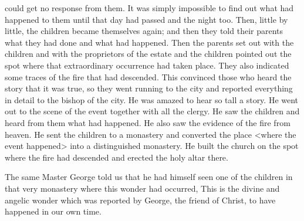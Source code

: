 could get no response from them.
It was simply impossible to find
out what had happened to them until that day had passed and the
night too.
Then, little by little, the children became themselves
again; and then they told their parents what they had done and
what had happened.
Then the parents set out with the children and
with the proprietors of the estate and the children pointed out the
spot where that extraordinary occurrence had taken place.
They also
indicated some traces of the fire that had descended.
This convinced
those who heard the story that it was true, so they went running to
the city and reported everything in detail to the bishop of the city.
He was amazed to hear so tall a story.
He went out to the scene of
the event together with all the clergy.
He saw the children and heard
from them what had happened.
He also saw the evidence of the fire
from heaven.
He sent the children to a monastery and converted the
place <where the event happened> into a distinguished monastery.
He built the church on the spot where the fire had descended and
erected the holy altar there.

The same Master George told us that he had himself seen one
of the children in that very monastery where this wonder had
occurred, This is the divine and angelic wonder which was reported
by George, the friend of Christ, to have happened in our own time.


